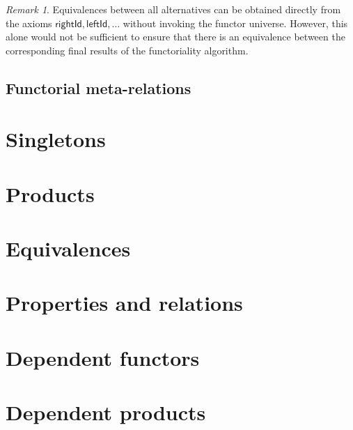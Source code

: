 \documentclass[a4paper]{article}
\theoremstyle{definition}
\theoremstyle{remark}
\newtheorem*{remark}{Remark}
\newcommand{\nm}{\mathsf}
\begin{document}
\begin{remark}
  Equivalences between all alternatives can be obtained directly from the axioms
  $\nm{rightId},\nm{leftId},\ldots$ without invoking the functor universe.
  However, this alone would not be sufficient to ensure that there is an equivalence
  between the corresponding final results of the functoriality algorithm.
\end{remark}

\subsection{Functorial meta-relations}

\section{Singletons}
\label{sec:singletons}

\section{Products}
\label{sec:products}

\section{Equivalences}
\label{sec:equivalences}

\section{Properties and relations}
\label{sec:properties}
\label{sec:relations}

\section{Dependent functors}

\section{Dependent products}



\end{document}
